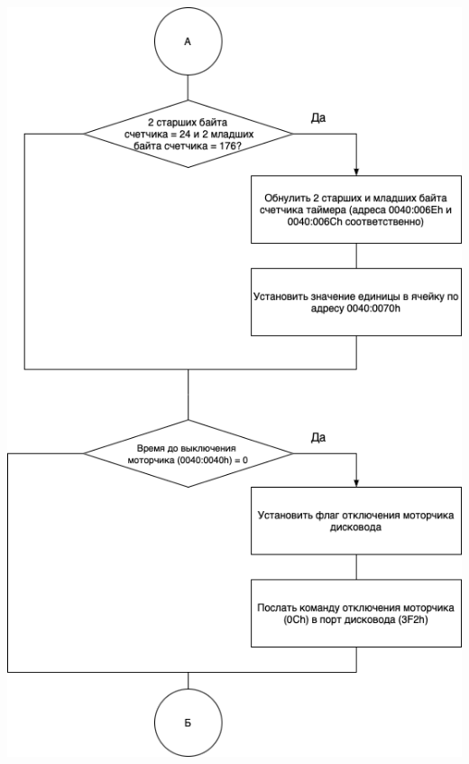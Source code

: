\documentclass[a4paper,14pt]{article}
\begin{document}
\begin{flushright}
	\includegraphics[scale=0.75]{int8h_2.png}

\end{flushright}
\end{document}
